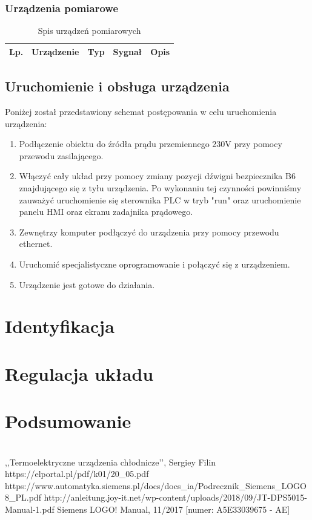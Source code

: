 \documentclass[oneside]{mgr}
\begin{document}
\subsection{Urządzenia pomiarowe}

\begin{table}[h]
\begin{center}
\begin{tabular}{|c|c|c|c|c|c|}
\hline
    Lp. & \multicolumn{2}{|c|}{Urządzenie} & Typ & Sygnał & Opis \\\hline
\end{tabular}
   \caption{Spis urządzeń pomiarowych}
\end{center}
\end{table}
\section{Uruchomienie i obsługa urządzenia}
Poniżej został przedstawiony schemat postępowania w celu uruchomienia urządzenia:
\begin{enumerate}
    \item Podłączenie obiektu do źródła prądu przemiennego 230V przy pomocy przewodu zasilającego.
    \item Włączyć cały układ przy pomocy zmiany pozycji dźwigni bezpiecznika B6 znajdującego się z tyłu urządzenia. Po wykonaniu tej czynności powinniśmy zauważyć uruchomienie się sterownika PLC w tryb "run" oraz uruchomienie panelu HMI oraz ekranu zadajnika prądowego.
    \item Zewnętrzy komputer podłączyć do urządzenia przy pomocy przewodu ethernet.
    \item Uruchomić specjalistyczne oprogramowanie i połączyć się z urządzeniem.
    \item Urządzenie jest gotowe do działania.
\end{enumerate}

\chapter{Identyfikacja}
\chapter{Regulacja układu}
\chapter{Podsumowanie}



\begin{thebibliography} 
\\
,,Termoelektryczne urządzenia chłodnicze’’, Sergiey Filin
https://elportal.pl/pdf/k01/20\_05.pdf
https://www.automatyka.siemens.pl/docs/docs\_ia/Podrecznik\_Siemens\_LOGO8\_PL.pdf
http://anleitung.joy-it.net/wp-content/uploads/2018/09/JT-DPS5015-Manual-1.pdf
Siemens LOGO! Manual, 11/2017 [numer: A5E33039675 - AE]
\end{thebibliography}

\listoffigures
\listoftables
\end{document}
